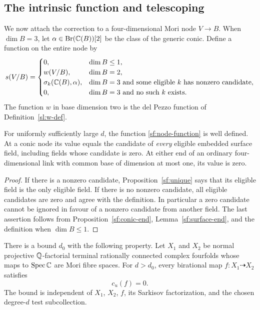 \subsection{The intrinsic function and telescoping}

We now attach the correction to a four-dimensional Mori node $V\to B$.
When $\dim B=3$, let
$\alpha\in\operatorname{Br}(\mathbb C(B))[2]$ be the class of the generic
conic.  Define a function on the entire node by
\begin{equation}\label{sf:node-function}
 s(V/B)=
 \begin{cases}
  0,&\dim B\leq1,\\
  w(V/B),&\dim B=2,\\
  \sigma_k(\mathbb C(B),\alpha),&\dim B=3\text{ and some eligible }k
       \text{ has nonzero candidate},\\
  0,&\dim B=3\text{ and no such }k\text{ exists}.
 \end{cases}
\end{equation}
The function $w$ in base dimension two is the del Pezzo function
of Definition~\ref{sl:w-def}.

\begin{theorem}\label{sf:intrinsic}
For uniformly sufficiently large $d$, the function
\eqref{sf:node-function} is well defined.  At a conic node its value
equals the candidate of \emph{every} eligible embedded surface
field, including fields whose candidate is zero.  At either end
of an ordinary four-dimensional link with common base of dimension
at most one, its value is zero.
\end{theorem}

\begin{proof}
If there is a nonzero candidate, Proposition~\ref{sf:unique} says
that its eligible field is the only eligible field.  If there is
no nonzero candidate, all eligible candidates are zero and agree
with the definition.  In particular a zero candidate cannot be
ignored in favour of a nonzero candidate from another field.
The last assertion follows from Proposition~\ref{sf:conic-end},
Lemma~\ref{sf:surface-end}, and the definition when $\dim B\leq1$.
\end{proof}

\begin{theorem}
\label{sf:vanishing}
There is a bound $d_0$ with the following property.  Let $X_1$ and
$X_2$ be normal projective $\mathbb Q$-factorial terminal rationally connected
complex fourfolds whose maps to $\operatorname{Spec}\mathbb C$ are Mori
fibre spaces.  For $d>d_0$, every birational map
$f:X_1\dashrightarrow X_2$ satisfies
\[
                              c_u(f)=0.
\]
The bound is independent of $X_1$, $X_2$, $f$, its Sarkisov
factorization, and the chosen degree-$d$ test subcollection.
\end{theorem}

